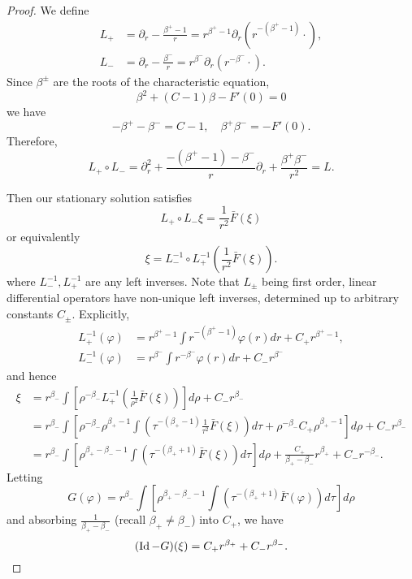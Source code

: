 \documentclass{amsart}
\begin{document}
\begin{proof}
We define
\begin{align*}
L_+ &= \partial_r - \frac{\beta^+ - 1}{r} = r^{\beta^+ - 1} \partial_r (r^{-(\beta^+ - 1)} \cdot) , \\
L_- &= \partial_r - \frac{\beta^-}{r} = r^{\beta^-} \partial_r (r^{-\beta^-} \cdot).
\end{align*}
Since \(\beta^{\pm}\) are the roots of the characteristic equation,
\[
\beta^2 + (C - 1) \beta - F'(0) = 0
\]
we have
\[
- \beta^+ - \beta^- = C-1, \quad \beta^+ \beta^- = -F'(0).
\]
Therefore,
\[
L_+ \circ L_- = \partial_r^2 + \frac{-(\beta^+ - 1) -\beta^-}{r} {\partial_r} + \frac{\beta^+ \beta^-}{r^2} = L.
\]

Then our stationary solution satisfies
\[
L_+ \circ L_- \xi = \frac{1}{r^2} \bar{F}(\xi)
\]
or equivalently
\[
\xi = L_-^{-1} \circ L_+^{-1} \left(\frac{1}{r^2} \bar{F}(\xi)\right).
\]
where \(L_-^{-1}, L_+^{-1}\) are any left inverses. Note that \(L_{\pm}\) being first order, linear differential operators have non-unique left inverses, determined up to arbitrary constants \(C_{\pm}\). Explicitly,
\begin{align*}
L_+^{-1} (\varphi) &= r^{\beta^+ - 1} \int r^{-(\beta^+ - 1)} \varphi(r) dr + C_+ r^{\beta^+-1}, \\
L_-^{-1} (\varphi) &= r^{\beta^-} \int r^{-\beta^-} \varphi(r) dr + C_- r^{\beta^-}
\end{align*}
and hence
\[
\begin{split}
\xi &= r^{\beta_-} \int \left[\rho^{-\beta_-} L_+^{-1} \left(\frac{1}{\rho^2} \bar{F}(\xi)\right)\right] d\rho + C_- r^{\beta_-} \\
&= r^{\beta_-} \int \left[\rho^{-\beta_-} \rho^{\beta_+ - 1} \int \left(\tau^{-(\beta_+ - 1)} \frac{1}{\tau^2} \bar{F}(\xi) \right)d\tau + \rho^{-\beta_-} C_+ \rho^{\beta_+-1}\right] d\rho + C_- r^{\beta_-} \\
&= r^{\beta_-} \int \left[\rho^{\beta_+ - \beta_- - 1} \int \left(\tau^{-(\beta_+ + 1)} \bar{F}(\xi) \right)d\tau\right] d\rho + \frac{C_+}{\beta_+ - \beta_-} r^{\beta_+} + C_- r^{-\beta_-}.
\end{split}
\]
Letting
\begin{equation}
\label{eq:stationaryC_G}
G(\varphi) = r^{\beta_-} \int \left[\rho^{\beta_+ - \beta_- - 1} \int \left(\tau^{-(\beta_+ + 1)} \bar{F}(\varphi) \right)d\tau\right] d\rho
\end{equation}
and absorbing \(\tfrac{1}{\beta_+ - \beta_-}\) (recall \(\beta_+ \ne \beta_-\)) into \(C_+\), we have
\begin{equation}
\label{eq:stationaryC_implicit}
(\operatorname{Id} - G) (\xi) = C_+ r^{\beta_+} + C_- r^{\beta_-}.
\end{equation}


\end{proof}
\end{document}
